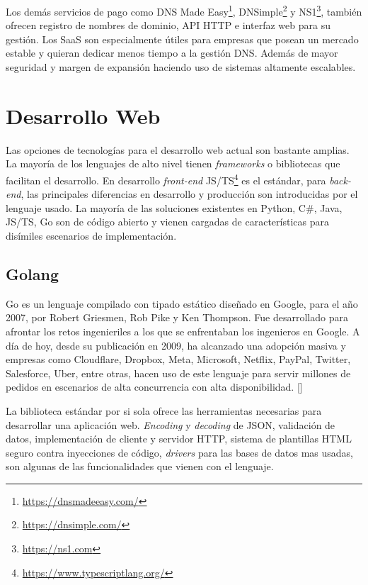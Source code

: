 Los demás servicios de pago como DNS Made Easy\footnote{\url{https://dnsmadeeasy.com/}}, DNSimple\footnote{\url{https://dnsimple.com/}} y NS1\footnote{\url{https://ns1.com}}, también ofrecen registro de nombres de dominio, API HTTP e interfaz web para su gestión. Los SaaS son especialmente útiles para empresas que posean un mercado estable y quieran dedicar menos tiempo a la gestión DNS. Además de mayor seguridad y margen de expansión haciendo uso de sistemas altamente escalables.

\section{Desarrollo Web}

Las opciones de tecnologías para el desarrollo web actual son bastante amplias. La mayoría de los lenguajes de alto nivel tienen \textit{frameworks} o bibliotecas que facilitan el desarrollo. En desarrollo \textit{front-end} JS/TS\footnote{\url{https://www.typescriptlang.org/}} es el estándar, para \textit{back-end}, las principales diferencias en desarrollo y producción son introducidas por el lenguaje usado. La mayoría de las soluciones existentes en Python, C\#, Java, JS/TS, Go son de código abierto y vienen cargadas de características para disímiles escenarios de implementación.

\subsection{Golang}

Go es un lenguaje compilado con tipado estático diseñado en Google, para el año 2007, por Robert Griesmen, Rob Pike y Ken Thompson. Fue desarrollado para afrontar los retos ingenieriles a los que se enfrentaban los ingenieros en Google. A día de hoy, desde su publicación en 2009, ha alcanzado una adopción masiva y empresas como Cloudflare, Dropbox, Meta, Microsoft, Netflix, PayPal, Twitter, Salesforce, Uber, entre otras, hacen uso de este lenguaje para servir millones de pedidos en escenarios de alta concurrencia con alta disponibilidad. [\cite{go-docs}]

La biblioteca estándar por si sola ofrece las herramientas necesarias para desarrollar una aplicación web. \textit{Encoding} y \textit{decoding} de JSON, validación de datos, implementación de cliente y servidor HTTP, sistema de plantillas HTML seguro contra inyecciones de código, \textit{drivers} para las bases de datos mas usadas, son algunas de las funcionalidades que vienen con el lenguaje.

